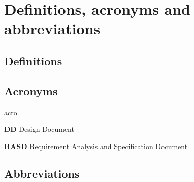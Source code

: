 
\section{Definitions, acronyms and abbreviations}

\subsection{Definitions}

\subsection{Acronyms}
	\begin{labeling}{acro}
		\item[\textbf{DD}] Design Document
		\item[\textbf{RASD}] Requirement Analysis and Specification Document
	\end{labeling}

\subsection{Abbreviations}
